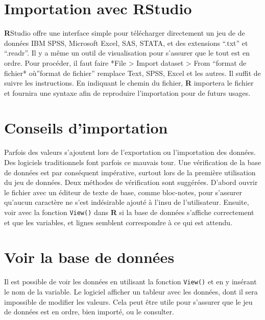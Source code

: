 \documentclass[
]{book}
\begin{document}
\hypertarget{importation-avec-rstudio}{%
\section{\texorpdfstring{Importation avec \textbf{R}Studio}{Importation avec RStudio}}\label{importation-avec-rstudio}}

\textbf{R}Studio offre une interface simple pour télécharger directement un jeu de de données IBM SPSS, Microsoft Excel, SAS, STATA, et des extensions ``.txt'' et ``.readr''. Il y a même un outil de visualisation pour s'assurer que le tout est en ordre. Pour procéder, il faut faire *File \textgreater{} Import dataset \textgreater{} From ``format de fichier* où''format de fichier'' remplace Text, SPSS, Excel et les autres. Il suffit de suivre les instructions. En indiquant le chemin du fichier, \textbf{R} importera le fichier et fournira une syntaxe afin de reproduire l'importation pour de futurs usages.

\hypertarget{conseils-dimportation}{%
\section{Conseils d'importation}\label{conseils-dimportation}}

Parfois des valeurs s'ajoutent lors de l'exportation ou l'importation des données. Des logiciels traditionnels font parfois ce mauvais tour. Une vérification de la base de données est par conséquent impérative, surtout lors de la première utilisation du jeu de données. Deux méthodes de vérification sont suggérées. D'abord ouvrir le fichier avec un éditeur de texte de base, comme bloc-notes, pour s'assurer qu'aucun caractère ne s'est indésirable ajouté à l'insu de l'utilisateur. Ensuite, voir avec la fonction \texttt{View()} dans \textbf{R} si la base de données s'affiche correctement et que les variables, et lignes semblent correspondre à ce qui est attendu.

\hypertarget{voir-la-base-de-donnuxe9es}{%
\section{Voir la base de données}\label{voir-la-base-de-donnuxe9es}}

Il est possible de voir les données en utilisant la fonction \texttt{View()} et en y insérant le nom de la variable. Le logiciel afficher un tableur avec les données, dont il sera impossible de modifier les valeurs. Cela peut être utile pour s'assurer que le jeu de données est en ordre, bien importé, ou le consulter.
\end{document}
